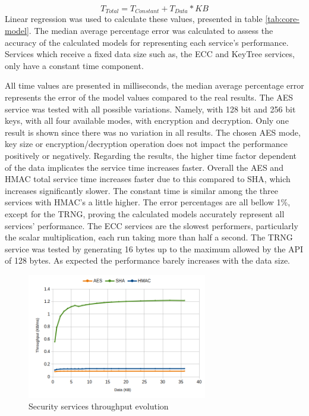 \begin{equation}
	\label{eq:linear-eq}
	T_{Total} = T_{Constant} + T_{Data} * KB
\end{equation}
Linear regression was used to calculate these values, presented in table \ref{tab:core-model}. The median average percentage error was calculated to assess the accuracy of the calculated models for representing each service's performance. Services which receive a fixed data size such as, the \ac{ECC} and KeyTree services, only have a constant time component.



All time values are presented in milliseconds, the median average percentage error represents the error of the model values compared to the real results.
The \ac{AES} service was tested with all possible variations. Namely, with 128 bit and 256 bit keys, with all four available modes, with encryption and decryption. Only one result is shown since there was no variation in all results. The chosen \ac{AES} mode, key size or encryption/decryption operation does not impact the performance positively or negatively.
Regarding the results, the higher time factor dependent of the data implicates the service time increases faster. Overall the \ac{AES} and \ac{HMAC} total service time increases faster due to this compared to \ac{SHA}, which increases significantly slower. The constant time is similar among the three services with \ac{HMAC}'s a little higher.
The error percentages are all bellow 1\%, except for the TRNG, proving the calculated models accurately represent all services' performance.
The \ac{ECC} services are the slowest performers, particularly the scalar multiplication, each run taking more than half a second.
The TRNG service was tested by generating 16 bytes up to the maximum allowed by the API of 128 bytes. As expected the performance barely increases with the data size.

\begin{figure}[h!]
	\centering
	\includegraphics[width=0.7\textwidth]{./Images/core-tput.png}
	\caption{Security services throughput evolution}
	\label{fig:performance:core-tput}
\end{figure}

